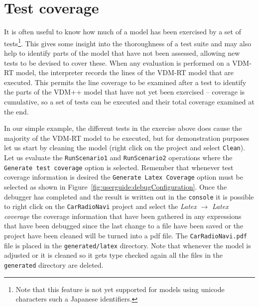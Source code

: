 
\section{Test coverage}\label{sec:testcov}

It is often useful to know how much of a model has been exercised by a
set of tests\footnote{Note that this feature is not yet supported for
  models using unicode characters such a Japanese identifiers.}. 
This gives some insight into the thoroughness of a test
suite and may also help to identify parts of the model that have not
been assessed, allowing new tests to be devised to cover these. When
any evaluation is performed on a VDM-RT model, the interpreter records
the lines of the VDM-RT model that are executed. This permits the line
coverage to be examined after a test to identify the parts of the
VDM++ model that have not yet been exercised -- coverage is
cumulative, so a set of tests can be executed and their total coverage
examined at the end.

In our simple example, the different tests in the exercise above does
cause the majority of the VDM-RT model to be executed, but for
demonstration purposes let us start by cleaning the model (right click
on the project and select \texttt{Clean}). Let us evaluate the
\texttt{RunScenario1} and \texttt{RunScenario2} operations where the
\texttt{Generate test coverage} option is selected. 
Remember that whenever test coverage
information is desired the \texttt{Generate Latex Coverage} option
must be selected as shown in Figure~\ref{fig:userguide:debugConfiguration}. 
 Once the debugger
has completed and the result is written out in the \texttt{console} it
is possible to right click on the \texttt{CarRadioNavi} project and
select the \emph{Latex} $ \rightarrow $ \emph{Latex coverage} the
coverage information that have been gathered in any expressions that
have been debugged since the last change to a file have been saved or
the project have been cleaned will be turned into a pdf file. The
\texttt{CarRadioNavi.pdf} file is placed in the
\texttt{generated/latex} directory. Note that whenever the model is
adjusted or it is cleaned so it gets type checked again all the files
in the \texttt{generated} directory are deleted.

